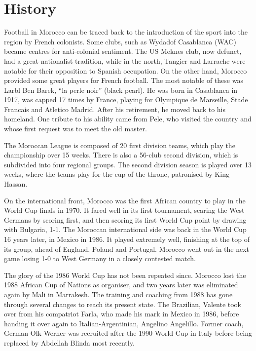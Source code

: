\section{History}
Football in Morocco can be traced back to the introduction of the sport into 
the region by French colonists. Some clubs, such as Wydadof Casablanca (WAC) 
became centres for anti-colonial sentiment. The US Meknes club, now defunct, 
had a great nationalist tradition, while in the north, Tangier and Larrache 
were notable for their opposition to Spanish occupation. On the other hand, 
Morocco provided some great players for French football. The most notable of 
these was Larbl Ben Barek, ``la perle noir'' (black pearl). He was born in 
Casablanca in 1917, was capped 17 times by France, playing for Olympique de 
Marseille, Stade Francais and Atletico Madrid. After his retirement, he moved 
back to his homeland. One tribute to his ability came from Pele, who visited 
the country and whose first request was to meet the old master.

The Moroccan League is composed of 20 first division teams, which play the 
championship over 15 weeks. There is also a 56-club second division, which is 
subdivided into four regional groups. The second division season is played over 
13 weeks, where the teams play for the cup of the throne, patronised by King 
Hassan.

On the international front, Morocco was the first African country to play in 
the World Cup finals in 1970. It fared well in its first tournament, scaring 
the West Germans by scoring first, and then scoring its first World Cup point 
by drawing with Bulgaria, 1-1. The Moroccan international side was back in the 
World Cup 16 years later, in Mexico in 1986. It played extremely well, 
finishing at the top of its group, ahead of England, Poland and Portugal. 
Morocco went out in the next game losing 1-0 to West Germany in a closely 
contested match.

The glory of the 1986 World Cup has not been repeated since. Morocco lost 
the 1988 African Cup of Nations as organiser, and two years later was 
eliminated again by Mali in Marrakesh. The training and coaching from 1988 has 
gone through several changes to reach its present state. The Brazilian, Valente
took over from his compatriot Farla, who made his mark in Mexico in 1986, 
before handing it over again to Italian-Argentinian, Angelino Angelillo. 
Former coach, German Olk Werner was recruited after the 1990 World Cup in Italy 
before being replaced by Abdellah Blinda most recently.
